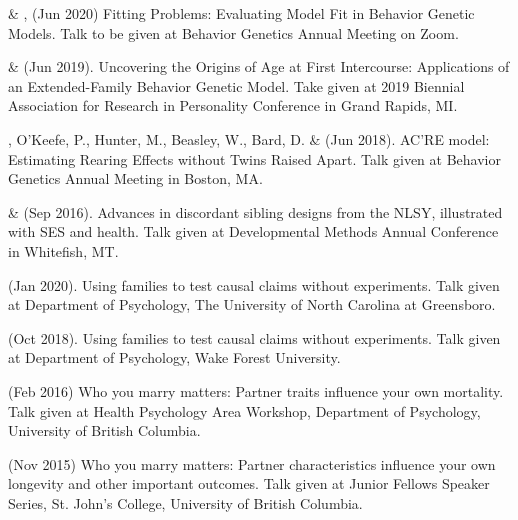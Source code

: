 
\item \meb \& \Joe, (Jun 2020) Fitting Problems: Evaluating Model Fit in Behavior Genetic Models. Talk to be given at Behavior Genetics Annual Meeting on Zoom.

\item \meb \& \Joe (Jun 2019). Uncovering the Origins of Age at First Intercourse: Applications of an Extended-Family Behavior Genetic Model. Take given at 2019 Biennial Association for Research in Personality Conference in Grand Rapids, MI.

\item\meb, O'Keefe, P., Hunter, M., Beasley, W., Bard, D. \& \Joe (Jun 2018). AC'RE model: Estimating Rearing Effects without Twins Raised Apart. Talk given at Behavior Genetics Annual Meeting in Boston, MA.

\item\meb \& \joe (Sep 2016). Advances in discordant sibling designs from the NLSY, illustrated with SES and health. Talk given at Developmental Methods Annual Conference in Whitefish, MT.\smallskip\\
%
\item\meb (Jan 2020). Using families to test causal claims without experiments. Talk given at Department of Psychology, The University of North Carolina at Greensboro. 
\item\meb (Oct 2018). Using families to test causal claims without experiments. Talk given at Department of Psychology, Wake Forest University. 
\item \meb (Feb 2016) Who you marry matters: Partner traits influence your own mortality. Talk given at Health Psychology Area Workshop, Department of Psychology, University of British Columbia. 

\item \meb (Nov 2015) Who you marry matters: Partner characteristics influence your own longevity and other important outcomes. Talk given at Junior Fellows Speaker Series, St. John's College, University of British Columbia. 


